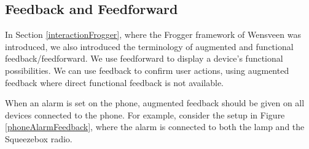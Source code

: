 %


\subsection{Feedback and Feedforward}
\label{section:feedbackAndFeedforward}

In Section \ref{interactionFrogger}, where the Frogger framework of Wensveen \cite{Wensveen2005} was introduced, we also introduced the terminology of augmented and functional feedback/feedforward. We use feedforward to display a device's functional possibilities. We can use feedback to confirm user actions, using augmented feedback where direct functional feedback is not available.

When an alarm is set on the phone, augmented feedback should be given on all devices connected to the phone. For example, consider the setup in Figure \ref{phoneAlarmFeedback}, where the alarm is connected to both the lamp and the Squeezebox radio. 

